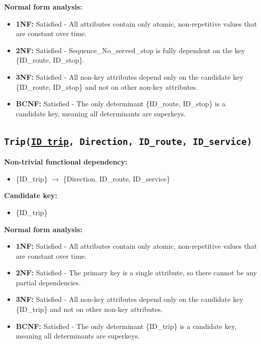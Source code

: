 \documentclass[a4paper, 12pt]{article}
\begin{document}
\textbf{Normal form analysis:}
\begin{itemize}
    \item \textbf{1NF:} Satisfied - All attributes contain only atomic, non-repetitive values that are constant over time.
    
    \item \textbf{2NF:} Satisfied - Sequence\_No\_served\_stop is fully dependent on the key \{ID\_route, ID\_stop\}.
    
    \item \textbf{3NF:} Satisfied - All non-key attributes depend only on the candidate key \{ID\_route, ID\_stop\} and not on other non-key attributes.
    
    \item \textbf{BCNF:} Satisfied - The only determinant \{ID\_route, ID\_stop\} is a candidate key, meaning all determinants are superkeys.
\end{itemize}
\subsection{\texttt{{Trip}(\underline{ID\_trip}, Direction, ID\_route, ID\_service)}}
\textbf{Non-trivial functional dependency:}
\begin{itemize}
    \item \{ID\_trip\} $\rightarrow$ \{Direction, ID\_route, ID\_service\}
\end{itemize}

\textbf{Candidate key:}
\begin{itemize}
    \item \{ID\_trip\}
\end{itemize}

\textbf{Normal form analysis:}
\begin{itemize}
    \item \textbf{1NF:} Satisfied - All attributes contain only atomic, non-repetitive values that are constant over time.
    
    \item \textbf{2NF:} Satisfied - The primary key is a single attribute, so there cannot be any partial dependencies.
    
    \item \textbf{3NF:} Satisfied - All non-key attributes depend only on the candidate key \{ID\_trip\} and not on other non-key attributes.
    
    \item \textbf{BCNF:} Satisfied - The only determinant \{ID\_trip\} is a candidate key, meaning all determinants are superkeys.
\end{itemize}
\end{document}
